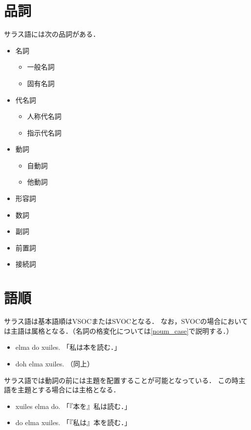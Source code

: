 \documentclass[uplatex]{jsarticle}
\begin{document}
\section{品詞}
サラス語には次の品詞がある．
\begin{itemize}
 \item 名詞
 \begin{itemize}
  \item 一般名詞
  \item 固有名詞
 \end{itemize} 
 \item 代名詞
 \begin{itemize}
  \item 人称代名詞
  \item 指示代名詞
 \end{itemize} 
 \item 動詞
 \begin{itemize}
  \item 自動詞
  \item 他動詞
 \end{itemize} 
 \item 形容詞
 \item 数詞
 \item 副詞
 \item 前置詞
 \item 接続詞
\end{itemize}

\section{語順}
サラス語は基本語順はVSOCまたはSVOCとなる．
なお，SVOCの場合においては主語は属格となる．（名詞の格変化については\ref{noum_case}で説明する．）
\begin{itemize}
 \item elma do xuiles. 「私は本を読む．」
 \item doh elma xuiles. （同上） 
\end{itemize}

サラス語では動詞の前には主題を配置することが可能となっている．
この時主語を主題とする場合には主格となる．
\begin{itemize}
 \item xuiles elma do. 「『本を』私は読む．」
 \item do elma xuiles. 「『私は』本を読む．」
\end{itemize}
\end{document}
